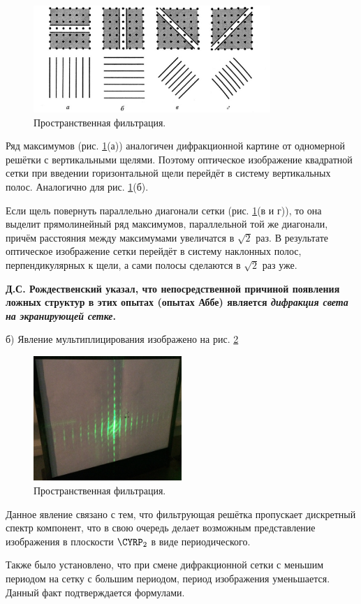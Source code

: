 \documentclass[a4paper, 12pt, twoside]{article}
\begin{document}
\begin{enumerate}
	\begin{figure}[H]
		\centering
		\includegraphics[width =  0.8\textwidth]{ris1}
		\caption{Пространственная фильтрация.}
		\label{ris1}
	\end{figure}

	
	
	 Ряд максимумов (рис. \ref{ris1}(а)) аналогичен дифракционной картине от одномерной решётки с вертикальными щелями. Поэтому оптическое изображение квадратной сетки при введении горизонтальной щели перейдёт в систему вертикальных полос. Аналогично для рис. \ref{ris1}(б).
	 
	 Если щель повернуть параллельно диагонали сетки (рис. \ref{ris1}(в и г)), то она   выделит прямолинейный ряд максимумов, параллельной той же диагонали, причём расстояния между максимумами увеличатся в $\sqrt{2}$ раз. В результате оптическое изображение сетки перейдёт в систему наклонных полос, перпендикулярных к щели, а сами полосы сделаются в $\sqrt{2}$ раз уже.	
	 
	 \textbf{Д.С. Рождественский указал, что непосредственной причиной появления ложных структур в этих опытах (опытах Аббе) является \textit{дифракция света на экранирующей сетке}.} 
	 
	 б) Явление мультиплицирования изображено на рис. \ref{multi}
	 
	 \begin{figure}[H]
	 	\centering
	 	\includegraphics[width =  0.5\textwidth]{multi}
	 	\caption{Пространственная фильтрация.}
	 	\label{multi}
	 \end{figure}
 
 	Данное явление связано с тем, что фильтрующая решётка пропускает дискретный спектр компонент, что в свою очередь делает возможным представление изображения в плоскости $\text{\CYRP}_2$ в виде периодического.
 
 	Также было установлено, что при смене дифракционной сетки с меньшим периодом на сетку с большим периодом, период изображения уменьшается. Данный факт подтверждается формулами.
	
	\end{enumerate}
\end{document}
